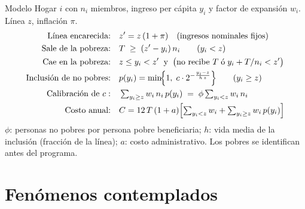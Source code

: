 \documentclass[aspectratio=169,11pt]{beamer}
\begin{document}
\begin{frame}{Modelo}
  Hogar $i$ con $n_i$ miembros, ingreso per cápita $y_i$ y factor de expansión $w_i$. Línea $z$, inflación $\pi$.
  \begin{align*}
    \text{Línea encarecida:}\quad & z' = z\,(1+\pi) \quad\text{(ingresos nominales fijos)}\\
    \text{Sale de la pobreza:}\quad & T \;\ge\; (z' - y_i)\, n_i \qquad (y_i < z)\\
    \text{Cae en la pobreza:}\quad & z \le y_i < z' \;\;\text{y}\;\; \bigl(\text{no recibe } T \;\text{ó}\; y_i + T/n_i < z'\bigr)\\
    \text{Inclusión de no pobres:}\quad & p(y_i) = \min\!\Bigl\{1,\; c \cdot 2^{-\frac{y_i - z}{h\,z}}\Bigr\} \qquad (y_i \ge z)\\
    \text{Calibración de } c:\quad & \textstyle\sum_{y_i\ge z} w_i\, n_i\, p(y_i) \;=\; \phi \sum_{y_i<z} w_i\, n_i\\
    \text{Costo anual:}\quad & C = 12\, T\, (1+a) \Bigl[\textstyle\sum_{y_i<z} w_i + \sum_{y_i\ge z} w_i\, p(y_i)\Bigr]
  \end{align*}
  \footnotesize $\phi$: personas no pobres por persona pobre beneficiaria; $h$: vida media de la inclusión
  (fracción de la línea); $a$: costo administrativo. Los pobres se identifican antes del programa.
\end{frame}

\section{Fenómenos contemplados}
\end{document}
